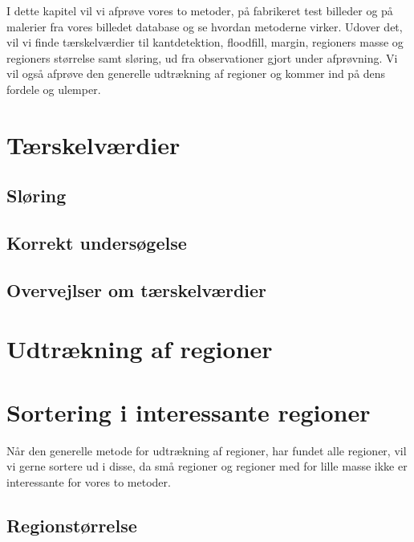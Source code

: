 {
{\sffamily
I dette kapitel vil vi afprøve vores to metoder, på fabrikeret test
billeder og på malerier fra vores billedet database og se hvordan
metoderne virker. Udover det, vil vi finde tærskelværdier til
kantdetektion, floodfill, margin, regioners masse og regioners størrelse
samt sløring, ud fra observationer gjort under afprøvning. Vi vil også
afprøve den generelle udtrækning af regioner og kommer ind på dens
fordele og ulemper.}

\section{Tærskelværdier\label{terskelverdi}}

\clearpage

\subsection{Sløring}

\clearpage

\subsection{Korrekt undersøgelse}


\subsection{Overvejlser om tærskelværdier}


\section{Udtrækning af regioner\label{region_detektor}}

\clearpage


\section{Sortering i interessante regioner}
{\sffamily Når den generelle metode for udtrækning af regioner, har
fundet alle regioner, vil vi gerne sortere ud i disse, da små
regioner og regioner med for lille masse ikke er interessante for vores
to metoder.
}

\subsection{Regionstørrelse \label{region_stoerlse}}

\clearpage

}
